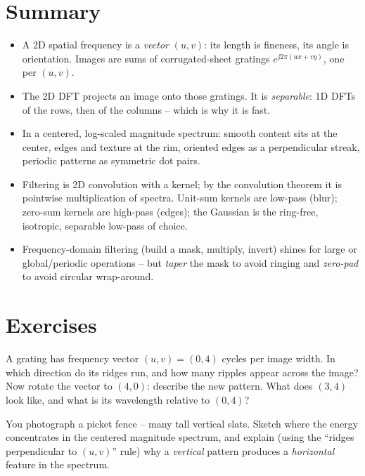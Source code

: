 \section{Summary}
\label{ch31:summary}

\begin{itemize}
\item A 2D spatial frequency is a \emph{vector} $(u,v)$: its length is fineness,
its angle is orientation. Images are sums of corrugated-sheet gratings
$e^{\jj2\pi(ux+vy)}$, one per $(u,v)$.
\item The 2D DFT projects an image onto those gratings. It is \emph{separable}:
1D DFTs of the rows, then of the columns -- which is why it is fast.
\item In a centered, log-scaled magnitude spectrum: smooth content sits at the
center, edges and texture at the rim, oriented edges as a perpendicular streak,
periodic patterns as symmetric dot pairs.
\item Filtering is 2D convolution with a kernel; by the convolution theorem it is
pointwise multiplication of spectra. Unit-sum kernels are low-pass (blur);
zero-sum kernels are high-pass (edges); the Gaussian is the ring-free, isotropic,
separable low-pass of choice.
\item Frequency-domain filtering (build a mask, multiply, invert) shines for large
or global/periodic operations -- but \emph{taper} the mask to avoid ringing and
\emph{zero-pad} to avoid circular wrap-around.
\end{itemize}

\section*{Exercises}

\begin{exercise}
\label{ch31:ex-direction}
A grating has frequency vector $(u,v)=(0,4)$ cycles per image width. In which
direction do its ridges run, and how many ripples appear across the image? Now
rotate the vector to $(4,0)$: describe the new pattern. What does $(3,4)$ look
like, and what is its wavelength relative to $(0,4)$?
\end{exercise}

\begin{exercise}
\label{ch31:ex-streak}
You photograph a picket fence -- many tall vertical slats. Sketch where the energy
concentrates in the centered magnitude spectrum, and explain (using the
``ridges perpendicular to $(u,v)$'' rule) why a \emph{vertical} pattern produces a
\emph{horizontal} feature in the spectrum.
\end{exercise}

